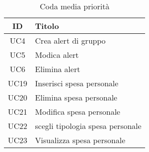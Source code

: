     \begin{table}[H]
        \centering
        \begin{tabular}{|c|l|}
        \hline
        \textbf{ID} & \textbf{Titolo} \\ \hline
        UC4 & Crea alert di gruppo\\ \hline
        UC5 & Modica alert \\ \hline
        UC6 & Elimina alert \\ \hline
        UC19 & Inserisci spesa personale \\ \hline
        UC20 & Elimina spesa personale \\ \hline
        UC21 & Modifica spesa personale \\ \hline
        UC22 & scegli tipologia spesa personale \\ \hline
        UC23 & Visualizza spesa personale \\ \hline
        \end{tabular}
        \caption{Coda media priorità}
    \end{table}

